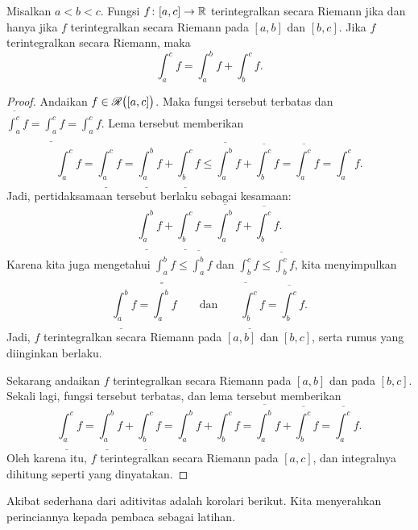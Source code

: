 \begin{prop}
Misalkan $a < b < c$.  Fungsi $f \colon [a,c] \to {\mathbb{R}}$ terintegralkan secara Riemann
jika dan hanya jika $f$ terintegralkan secara Riemann pada $[a,b]$ dan $[b,c]$.  Jika
$f$ terintegralkan secara Riemann, maka
\begin{equation*}
\int_a^c f
=
\int_a^b f
+
\int_b^c f .
\end{equation*}
\end{prop}

\begin{proof}
Andaikan $f \in {\mathscr{R}}\bigl([a,c]\bigr)$.  Maka fungsi tersebut terbatas dan
$\overline{\int_a^c} f = 
\underline{\int_a^c} f = 
\int_a^c f$.  Lema tersebut memberikan
\begin{equation*}
\int_a^c f
=
\underline{\int_a^c} f
 =
\underline{\int_a^b} f + \underline{\int_b^c} f
 \leq
\overline{\int_a^b} f + \overline{\int_b^c} f
 =
\overline{\int_a^c} f
 =
\int_a^c f .
\end{equation*}
Jadi, pertidaksamaan tersebut berlaku sebagai kesamaan:
\begin{equation*}
\underline{\int_a^b} f + \underline{\int_b^c} f
=
\overline{\int_a^b} f + \overline{\int_b^c} f .
\end{equation*}
Karena kita juga mengetahui
$\underline{\int_a^b} f \leq \overline{\int_a^b} f$
dan
$\underline{\int_b^c} f \leq \overline{\int_b^c} f$, kita
menyimpulkan
\begin{equation*}
\underline{\int_a^b} f
=
\overline{\int_a^b} f
\qquad \text{dan} \qquad
\underline{\int_b^c} f
=
\overline{\int_b^c} f .
\end{equation*}
Jadi, $f$ terintegralkan secara Riemann pada $[a,b]$ dan $[b,c]$, serta rumus yang diinginkan
berlaku.

Sekarang andaikan $f$ terintegralkan secara Riemann pada $[a,b]$ dan pada $[b,c]$.
Sekali lagi, fungsi tersebut terbatas, dan lema tersebut memberikan
\begin{equation*}
\underline{\int_a^c} f
=
\underline{\int_a^b} f + \underline{\int_b^c} f
=
\int_a^b f + \int_b^c f
=
\overline{\int_a^b} f + \overline{\int_b^c} f
=
\overline{\int_a^c} f .
\end{equation*}
Oleh karena itu, $f$ terintegralkan secara Riemann pada $[a,c]$, dan integralnya dihitung
seperti yang dinyatakan.
\end{proof}

Akibat sederhana dari aditivitas adalah korolari berikut.  Kita
menyerahkan perinciannya kepada pembaca sebagai latihan.

